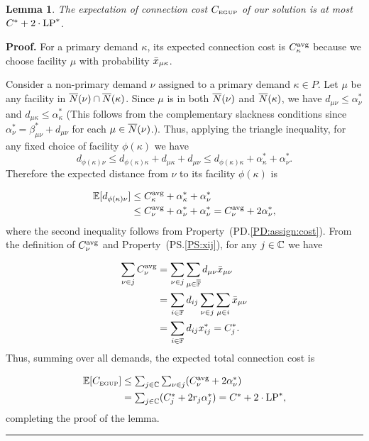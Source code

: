 \documentclass[oneside,final]{ucr}
\newtheorem{lemma}[theorem]{Lemma}
\newenvironment{proof}[1][Proof]{\textbf{#1.} }{\ \rule{0.5em}{0.5em}}
\def\dsp{\def\baselinestretch{2.0}\large\normalsize}
\def\ssp{\def\baselinestretch{1.0}\large\normalsize}
\begin{document}
\begin{lemma}\label{lemma:3dist}
The expectation of connection cost $C_{\mbox{\tiny\rm EGUP}}$ of our solution
is at most  $C^\ast+2\cdot\mbox{\rm LP}^\ast$.
\end{lemma}
\begin{proof}
  For a primary demand $\kappa$, its expected connection cost is
  $C_{\kappa}^{{\mbox{\scriptsize\rm avg}}}$ because we choose facility $\mu$ with
  probability ${\bar x}_{\mu\kappa}$.

  Consider a non-primary demand $\nu$ assigned to a primary demand
  $\kappa\in P$. Let $\mu$ be any facility in ${\overline{N}}(\nu) \cap
  {\overline{N}}(\kappa)$.  Since $\mu$ is in both ${\overline{N}}(\nu)$ and
  ${\overline{N}}(\kappa)$, we have $d_{\mu\nu} \leq \alpha_{\nu}^\ast$ and
  $d_{\mu\kappa} \leq \alpha_{\kappa}^\ast$ (This follows from the
  complementary slackness conditions since
  $\alpha_{\nu}^\ast=\beta_{\mu\nu}^\ast + d_{\mu\nu}$ for each
  $\mu\in {\overline{N}}(\nu)$.). Thus, applying the triangle inequality, for
  any fixed choice of facility $\phi(\kappa)$ we have
%
\begin{equation*}
    d_{\phi(\kappa)\nu} \leq d_{\phi(\kappa)\kappa}+d_{\mu\kappa}+d_{\mu\nu}
    \leq d_{\phi(\kappa)\kappa} + \alpha_{\kappa}^\ast + \alpha_{\nu}^\ast.
\end{equation*}
%
Therefore the expected distance from $\nu$ to its facility $\phi(\kappa)$ is 

\ssp
\begin{align*}
  \mathbb{E}[  d_{\phi(\kappa)\nu}   ] &\le C^{{\mbox{\scriptsize\rm avg}}}_{\kappa} + \alpha_{\kappa}^\ast + \alpha_{\nu}^\ast 
\\
  &\leq C^{{\mbox{\scriptsize\rm avg}}}_{\nu} + \alpha_{\nu}^\ast + \alpha_{\nu}^\ast
   = C^{{\mbox{\scriptsize\rm avg}}}_{\nu} + 2\alpha_{\nu}^\ast,
  \end{align*}
\dsp
  where the second inequality follows from Property~(PD.\ref{PD:assign:cost}).  
From the definition of $C^{{\mbox{\scriptsize\rm avg}}}_{\nu}$ and Property~(PS.\ref{PS:xij}), for any $j\in \mathbb{C}$ 
we have

\ssp
\begin{align*}
\sum_{\nu\in j} C^{{\mbox{\scriptsize\rm avg}}}_{\nu} &= \sum_{\nu\in j}\sum_{\mu\in\overline{\mathbb{F}}}d_{\mu\nu}{\bar x}_{\mu\nu}
			\\
 			&= \sum_{i\in\mathbb{F}} d_{ij}\sum_{\nu\in j}\sum_{\mu\in i}{\bar x}_{\mu\nu}
			\\
			&= \sum_{i\in\mathbb{F}} d_{ij}x^\ast_{ij} 
			= C^\ast_j.
\end{align*}
\dsp
Thus, summing over all demands, the expected total connection cost is

\ssp
\begin{align*}
    \mathbb{E}[C_{\mbox{\tiny\rm EGUP}}] &\le 
			\textstyle{\sum_{j\in\mathbb{C}} \sum_{\nu\in j}} (C^{{\mbox{\scriptsize\rm avg}}}_{\nu} + 2\alpha_{\nu}^\ast) 
			\\
    	& = \textstyle{\sum_{j\in\mathbb{C}}} (C_j^\ast + 2r_j\alpha_j^\ast)
 		= C^\ast + 2\cdot\mbox{\rm LP}^\ast,
\end{align*}
\dsp
completing the proof of the lemma.
\end{proof}
\end{document}
